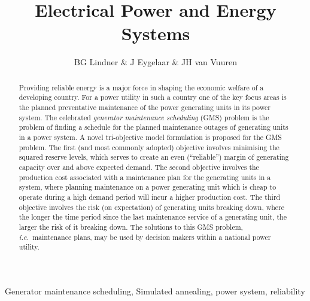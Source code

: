 \documentclass[review]{elsarticle}
\begin{document}
\begin{frontmatter}

\title{Electrical Power and Energy Systems}

\author{BG Lindner  \& J Eygelaar \& JH van Vuuren}




\begin{abstract}
Providing reliable energy is a major force in shaping the economic welfare of a developing country. For a power utility in such a country one of the key focus areas is the planned preventative
maintenance of the power generating units in its power system. The celebrated \textit{generator maintenance scheduling} (GMS) problem is the problem of finding a schedule
for the planned maintenance outages of generating units in a power system. 
A novel tri-objective model formulation is proposed for the GMS problem.
The first (and most commonly adopted) objective involves minimising the squared reserve levels, which serves to create an even (``reliable'') margin of generating capacity over and above expected demand. 
The second objective involves the
production cost associated with a maintenance plan for the generating units in a system, where planning maintenance on a power generating unit which is cheap to operate during a high demand period will incur 
a higher production cost. The third objective
involves the risk (on expectation) of generating units breaking down, where the longer the time period since the last maintenance service of a generating unit, the larger the risk of it breaking down.
The solutions to this GMS problem, \textit{i.e.}\ maintenance plans, may be used by decision makers within a national power utility. 
\end{abstract}

\begin{keyword}
Generator maintenance scheduling, Simulated annealing, power system, reliability
\end{keyword}

\end{frontmatter}
\end{document}
